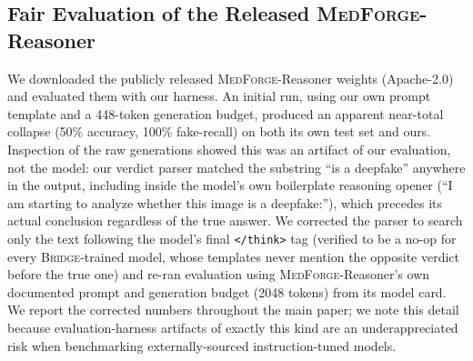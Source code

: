 \documentclass[10pt,twocolumn,letterpaper]{article}
\newcommand{\bridge}{\textsc{Bridge}}
\newcommand{\medforge}{\textsc{MedForge}}
\begin{document}
\begin{table}[t]
\centering
\small
\caption{Stage contribution ablation, Cross-Forgery test set ($n{=}2{,}994$). Each row adds one stage of the \bridge{} recipe.}
\label{tab:ablation-stage-contribution}
\end{table}

\subsection{Fair Evaluation of the Released \medforge{}-Reasoner}
We downloaded the publicly released \medforge{}-Reasoner weights (Apache-2.0) and evaluated them with our harness. An initial run, using our own prompt template and a 448-token generation budget, produced an apparent near-total collapse (50\% accuracy, 100\% fake-recall) on both its own test set and ours. Inspection of the raw generations showed this was an artifact of our evaluation, not the model: our verdict parser matched the substring ``is a deepfake'' anywhere in the output, including inside the model's own boilerplate reasoning opener (``I am starting to analyze whether this image is a deepfake:''), which precedes its actual conclusion regardless of the true answer. We corrected the parser to search only the text following the model's final \texttt{</think>} tag (verified to be a no-op for every \bridge{}-trained model, whose templates never mention the opposite verdict before the true one) and re-ran evaluation using \medforge{}-Reasoner's own documented prompt and generation budget (2048 tokens) from its model card. We report the corrected numbers throughout the main paper; we note this detail because evaluation-harness artifacts of exactly this kind are an underappreciated risk when benchmarking externally-sourced instruction-tuned models.
\end{document}

